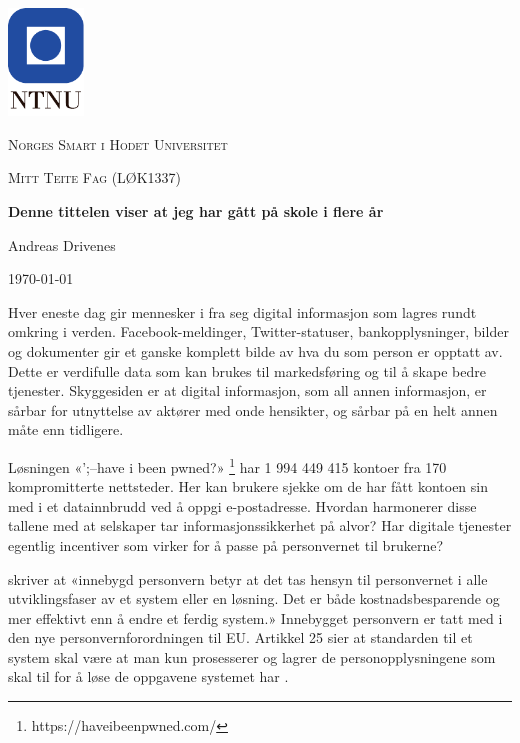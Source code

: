 \documentclass[12pt,a4paper, norsk]{article}
\begin{document}
\begin{titlepage}
	\centering
	\vspace{2.5cm}
	\includegraphics[width=0.15\textwidth]{figs/logo}\par\vspace{1cm}
	{\scshape\LARGE Norges Smart i Hodet Universitet \par}
	\vspace{1cm}
	{\scshape\Large Mitt Teite Fag (LØK1337)\par}
	\vspace{1.5cm}
	{\huge\bfseries Denne tittelen viser at jeg har gått på skole i flere år\par}
	\vspace{2cm}
	{\Large Andreas Drivenes\par}
	\vfill
	{\large \today\par}
\end{titlepage}

Hver eneste dag gir mennesker i fra seg digital informasjon som lagres
rundt omkring i verden. Facebook-meldinger, Twitter-statuser,
bankopplysninger, bilder og dokumenter gir et ganske komplett bilde
av hva du som person er opptatt av. Dette er verdifulle
data som kan brukes til markedsføring og til å skape bedre tjenester.
Skyggesiden er at digital informasjon, som all annen informasjon, er sårbar for utnyttelse
av aktører med onde hensikter, og sårbar på en helt annen måte enn tidligere.

Løsningen «';--have i been pwned?» \footnote{https://haveibeenpwned.com/}
har 1 994 449 415 kontoer fra 170
kompromitterte nettsteder. Her kan brukere sjekke om de har fått kontoen
sin med i et datainnbrudd ved å oppgi e-postadresse. Hvordan harmonerer disse
tallene med at selskaper tar informasjonssikkerhet på alvor? Har digitale
tjenester egentlig incentiver som virker for å passe på personvernet til brukerne?

\citet{datatilsynet} skriver at
«innebygd personvern betyr at det tas hensyn til personvernet i alle utviklingsfaser
av et system eller en løsning. Det er både kostnadsbesparende og mer effektivt enn
å endre et ferdig system.» Innebygget personvern
er tatt med i den nye personvernforordningen til EU.
Artikkel 25 sier at standarden til et system skal være at man kun prosesserer og lagrer de
personopplysningene som skal til for å løse de oppgavene systemet har \citep{eu-regulation}.
\end{document}
